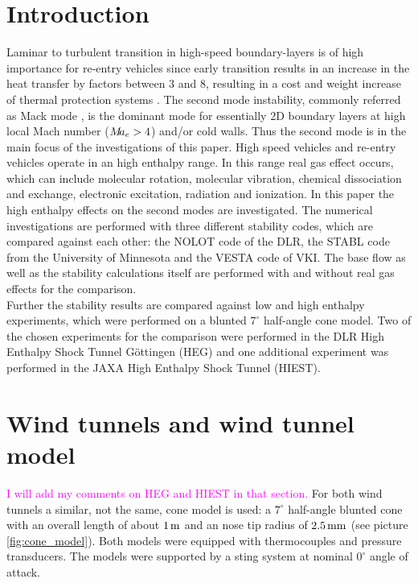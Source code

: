 \documentclass[]{aiaa-tc}%
\begin{document}
\section{Introduction}

Laminar to turbulent transition in high-speed boundary-layers is of high importance for re-entry vehicles since early transition results in an increase in the heat transfer by factors between 3 and 8, resulting in a cost and weight increase of thermal protection systems \cite{Schneider_1999,Schneider_2004}. The second mode instability, commonly referred as Mack mode \cite{Mack_1984}, is the dominant mode for essentially 2D boundary layers at high local Mach number ($M\hspace{-0.08cm} a_e > 4$) and/or cold walls\cite{Mack_1984}. Thus the second mode is in the main focus of the investigations of this paper. High speed vehicles and re-entry vehicles operate in an high enthalpy range. In this range real gas effect occurs, which can include molecular rotation, molecular vibration, chemical dissociation and exchange, electronic excitation, radiation and ionization. In this paper the high enthalpy effects on the second modes are investigated. The numerical investigations are performed with three different stability codes, which are compared against each other: the NOLOT code of the DLR, the STABL code from the University of Minnesota and the VESTA code of VKI. The base flow as well as the stability calculations itself are performed with and without real gas effects for the comparison.\\

Further the stability results are compared against low and high enthalpy experiments, which were performed on a blunted $7^\circ$ half-angle cone model. Two of the chosen experiments for the comparison were performed in the DLR High Enthalpy Shock Tunnel G\"ottingen (HEG) and one additional experiment was performed in the JAXA High Enthalpy Shock Tunnel (HIEST).






\section{Wind tunnels and wind tunnel model}\label{sect:model}
\textcolor{magenta}{I will add my comments on HEG and HIEST in that section.}
For both wind tunnels a similar, not the same, cone model is used: a $7^\circ$ half-angle blunted cone with an overall length of about $1 \hspace{0.05cm} \rm m$ and an nose tip radius of $2.5\hspace{0.05cm} \rm mm$ (see picture \ref{fig:cone_model}). Both models were equipped with thermocouples and pressure transducers. The models were supported by a sting system at nominal $0^\circ$ angle of attack.\\
\end{document}
